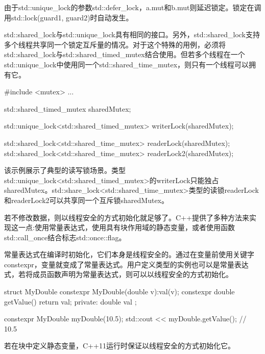 由于std::unique\_lock的参数std::defer\_lock，a.mut和b.mut则延迟锁定。锁定在调用std::lock(guard1, guard2)时自动发生。



std::shared\_lock与std::unique\_lock具有相同的接口。另外，std::shared\_lock支持多个线程共享同一个锁定互斥量的情况。对于这个特殊的用例，必须将std::shared\_lock与std::shared\_timed\_mutex结合使用。但若多个线程在一个std::unique\_lock中使用同一个std::shared\_time\_mutex，则只有一个线程可以拥有它。

\begin{cpp}
#include <mutex>
...

std::shared_timed_mutex sharedMutex;

std::unique_lock<std::shared_timed_mutex> writerLock(sharedMutex);

std::shared_lock<std::shared_time_mutex> readerLock(sharedMutex);
std::shared_lock<std::shared_time_mutex> readerLock2(sharedMutex);
\end{cpp}

该示例展示了典型的读写锁场景。类型std::unique\_lock<std::shared\_timed\_mutex>的writerLock只能独占sharedMutex。std::share\_lock<std::shared\_time\_mutex>类型的读锁readerLock和readerLock2可以共享同一个互斥锁sharedMutex。


若不修改数据，则以线程安全的方式初始化就足够了。C++提供了多种方法来实现这一点:使用常量表达式，使用具有块作用域的静态变量，或者使用函数std::call\_once结合标志std::once::flag。



常量表达式在编译时初始化，它们本身是线程安全的。通过在变量前使用关键字constexpr，变量就变成了常量表达式。用户定义类型的实例也可以是常量表达式，若将成员函数声明为常量表达式，则可以以线程安全的方式初始化。

\begin{cpp}
struct MyDouble{
	constexpr MyDouble(double v):val(v){};
	constexpr double getValue(){ return val; }
private:
	double val
};

constexpr MyDouble myDouble(10.5);
std::cout << myDouble.getValue(); // 10.5
\end{cpp}


若在块中定义静态变量，C++11运行时保证以线程安全的方式初始化它。

